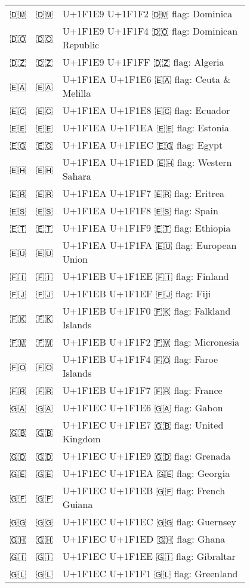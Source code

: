 \documentclass[a4paper,12pt]{ltjarticle}
\newcommand{\fontA}[1]{{\fontspec[RawFeature={mode=harf,+dist,+ccmp}]{Segoe UI Emoji} #1}}
\newcommand{\fontB}[1]{{\fontspec[RawFeature={mode=harf,+dist,+ccmp}]{Noto Color Emoji} #1}}
\begin{document}
\begin{longtable}[c]{ccp{0.8\linewidth}}
\fontA{🇩🇲}&\fontB{🇩🇲}&U+1F1E9 U+1F1F2 🇩🇲 flag: Dominica\\
\fontA{🇩🇴}&\fontB{🇩🇴}&U+1F1E9 U+1F1F4 🇩🇴 flag: Dominican Republic\\
\fontA{🇩🇿}&\fontB{🇩🇿}&U+1F1E9 U+1F1FF 🇩🇿 flag: Algeria\\
\fontA{🇪🇦}&\fontB{🇪🇦}&U+1F1EA U+1F1E6 🇪🇦 flag: Ceuta \& Melilla\\
\fontA{🇪🇨}&\fontB{🇪🇨}&U+1F1EA U+1F1E8 🇪🇨 flag: Ecuador\\
\fontA{🇪🇪}&\fontB{🇪🇪}&U+1F1EA U+1F1EA 🇪🇪 flag: Estonia\\
\fontA{🇪🇬}&\fontB{🇪🇬}&U+1F1EA U+1F1EC 🇪🇬 flag: Egypt\\
\fontA{🇪🇭}&\fontB{🇪🇭}&U+1F1EA U+1F1ED 🇪🇭 flag: Western Sahara\\
\fontA{🇪🇷}&\fontB{🇪🇷}&U+1F1EA U+1F1F7 🇪🇷 flag: Eritrea\\
\fontA{🇪🇸}&\fontB{🇪🇸}&U+1F1EA U+1F1F8 🇪🇸 flag: Spain\\
\fontA{🇪🇹}&\fontB{🇪🇹}&U+1F1EA U+1F1F9 🇪🇹 flag: Ethiopia\\
\fontA{🇪🇺}&\fontB{🇪🇺}&U+1F1EA U+1F1FA 🇪🇺 flag: European Union\\
\fontA{🇫🇮}&\fontB{🇫🇮}&U+1F1EB U+1F1EE 🇫🇮 flag: Finland\\
\fontA{🇫🇯}&\fontB{🇫🇯}&U+1F1EB U+1F1EF 🇫🇯 flag: Fiji\\
\fontA{🇫🇰}&\fontB{🇫🇰}&U+1F1EB U+1F1F0 🇫🇰 flag: Falkland Islands\\
\fontA{🇫🇲}&\fontB{🇫🇲}&U+1F1EB U+1F1F2 🇫🇲 flag: Micronesia\\
\fontA{🇫🇴}&\fontB{🇫🇴}&U+1F1EB U+1F1F4 🇫🇴 flag: Faroe Islands\\
\fontA{🇫🇷}&\fontB{🇫🇷}&U+1F1EB U+1F1F7 🇫🇷 flag: France\\
\fontA{🇬🇦}&\fontB{🇬🇦}&U+1F1EC U+1F1E6 🇬🇦 flag: Gabon\\
\fontA{🇬🇧}&\fontB{🇬🇧}&U+1F1EC U+1F1E7 🇬🇧 flag: United Kingdom\\
\fontA{🇬🇩}&\fontB{🇬🇩}&U+1F1EC U+1F1E9 🇬🇩 flag: Grenada\\
\fontA{🇬🇪}&\fontB{🇬🇪}&U+1F1EC U+1F1EA 🇬🇪 flag: Georgia\\
\fontA{🇬🇫}&\fontB{🇬🇫}&U+1F1EC U+1F1EB 🇬🇫 flag: French Guiana\\
\fontA{🇬🇬}&\fontB{🇬🇬}&U+1F1EC U+1F1EC 🇬🇬 flag: Guernsey\\
\fontA{🇬🇭}&\fontB{🇬🇭}&U+1F1EC U+1F1ED 🇬🇭 flag: Ghana\\
\fontA{🇬🇮}&\fontB{🇬🇮}&U+1F1EC U+1F1EE 🇬🇮 flag: Gibraltar\\
\fontA{🇬🇱}&\fontB{🇬🇱}&U+1F1EC U+1F1F1 🇬🇱 flag: Greenland\\

\end{longtable}
\end{document}

